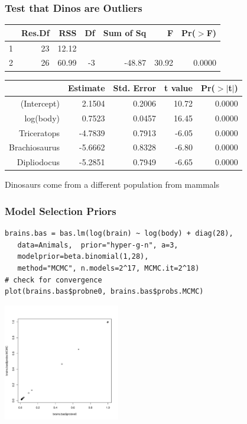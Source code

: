 \documentclass[handout]{beamer}
\begin{document}
  \begin{frame}
    \frametitle{Test that Dinos are Outliers}
    \begin{table}[ht]
\begin{center}
\begin{tabular}{lrrrrrr}
  \hline
 & Res.Df & RSS & Df & Sum of Sq & F & Pr($>$F) \\ 
  \hline
1 & 23 & 12.12 &  &  &  &  \\ 
  2 & 26 & 60.99 & -3 & -48.87 & 30.92 & 0.0000 \\ 
   \hline
\end{tabular}
\end{center}
\pause
\begin{table}[ht]
\begin{center}
\begin{tabular}{rrrrr}
  \hline
 & Estimate & Std. Error & t value & Pr($>$$|$t$|$) \\ 
  \hline
(Intercept) & 2.1504 & 0.2006 & 10.72 & 0.0000 \\ 
  log(body) & 0.7523 & 0.0457 & 16.45 & 0.0000 \\ 
  Triceratops & -4.7839 & 0.7913 & -6.05 & 0.0000 \\ 
  Brachiosaurus & -5.6662 & 0.8328 & -6.80 & 0.0000 \\ 
  Dipliodocus & -5.2851 & 0.7949 & -6.65 & 0.0000 \\ 
   \hline
\end{tabular}
\end{center}
\end{table}
\pause
Dinosaurs come from a different population from mammals
\end{table}
  \end{frame}
\begin{frame}[fragile]  \frametitle{Model Selection Priors}
\begin{verbatim}
brains.bas = bas.lm(log(brain) ~ log(body) + diag(28),
   data=Animals,  prior="hyper-g-n", a=3, 
   modelprior=beta.binomial(1,28), 
   method="MCMC", n.models=2^17, MCMC.it=2^18)
# check for convergence
plot(brains.bas$probne0, brains.bas$probs.MCMC)
\end{verbatim}
\includegraphics[height=2in]{bas-animals-conv}
\end{frame}
\end{document}
